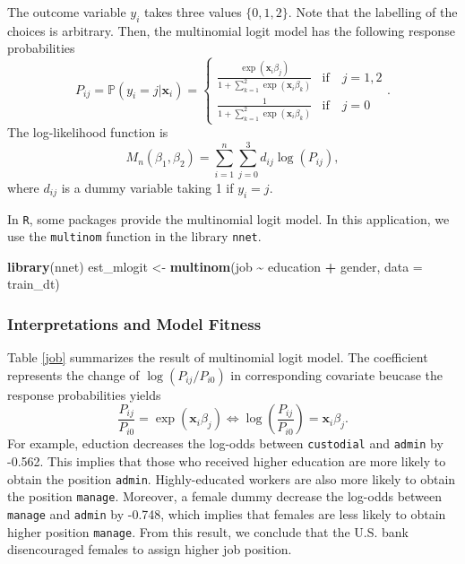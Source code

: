 \documentclass[
  12pt,
]{article}
\newenvironment{Shaded}{\begin{snugshade}}{\end{snugshade}}
\newcommand{\DataTypeTok}[1]{\textcolor[rgb]{0.13,0.29,0.53}{#1}}
\newcommand{\KeywordTok}[1]{\textcolor[rgb]{0.13,0.29,0.53}{\textbf{#1}}}
\newcommand{\NormalTok}[1]{#1}
\newcommand{\OperatorTok}[1]{\textcolor[rgb]{0.81,0.36,0.00}{\textbf{#1}}}
\newcommand{\StringTok}[1]{\textcolor[rgb]{0.31,0.60,0.02}{#1}}
\begin{document}
The outcome variable \(y_i\) takes three values \(\{0, 1, 2\}\).
Note that the labelling of the choices is arbitrary.
Then, the multinomial logit model has the following response probabilities
\begin{equation*}
  P_{ij} = \mathbb{P}(y_i = j | \mathbf{x}_i) =
  \begin{cases}
    \frac{\exp(\mathbf{x}_i \beta_j)}{1 + \sum_{k=1}^2 \exp(\mathbf{x}_i \beta_k)} &\text{if}\quad j = 1, 2  \\
    \frac{1}{1 + \sum_{k=1}^2 \exp(\mathbf{x}_i \beta_k)}  &\text{if}\quad j = 0
  \end{cases}.
\end{equation*}
The log-likelihood function is
\begin{equation*}
  M_n(\beta_1, \beta_2) = \sum_{i=1}^n \sum_{j=0}^3 d_{ij} \log (P_{ij}),
\end{equation*}
where \(d_{ij}\) is a dummy variable taking 1 if \(y_i = j\).

In \texttt{R}, some packages provide the multinomial logit model.
In this application, we use the \texttt{multinom} function in the library \texttt{nnet}.

\begin{Shaded}
\begin{Highlighting}[]
\KeywordTok{library}\NormalTok{(nnet)}
\NormalTok{est\_mlogit \textless{}{-}}\StringTok{ }\KeywordTok{multinom}\NormalTok{(job }\OperatorTok{\textasciitilde{}}\StringTok{ }\NormalTok{education }\OperatorTok{+}\StringTok{ }\NormalTok{gender, }\DataTypeTok{data =}\NormalTok{ train\_dt)}
\end{Highlighting}
\end{Shaded}

\hypertarget{interpretations-and-model-fitness}{%
\subsubsection{Interpretations and Model Fitness}\label{interpretations-and-model-fitness}}

Table \ref{job} summarizes the result of multinomial logit model.
The coefficient represents the change of \(\log(P_{ij}/P_{i0})\) in corresponding covariate
beucase the response probabilities yields
\begin{equation*}
    \frac{P_{ij}}{P_{i0}} = \exp(\mathbf{x}_i \beta_j)  \Leftrightarrow
    \log \left( \frac{P_{ij}}{P_{i0}} \right) = \mathbf{x}_i \beta_j.
\end{equation*}
For example, eduction decreases the log-odds between \texttt{custodial} and \texttt{admin} by -0.562.
This implies that those who received higher education are more likely to obtain the position \texttt{admin}.
Highly-educated workers are also more likely to obtain the position \texttt{manage}.
Moreover, a female dummy decrease the log-odds between \texttt{manage} and \texttt{admin} by -0.748,
which implies that females are less likely to obtain higher position \texttt{manage}.
From this result, we conclude that the U.S. bank disencouraged females to assign higher job position.
\end{document}
